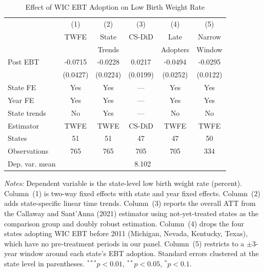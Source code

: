 \begin{table}[htbp]
\centering
\caption{Effect of WIC EBT Adoption on Low Birth Weight Rate}
\label{tab:main}
\begin{tabular}{lccccc}
\hline\hline
 & (1) & (2) & (3) & (4) & (5) \\
 & TWFE & State & CS-DiD & Late & Narrow \\
 & & Trends & & Adopters & Window \\
\hline
Post EBT & -0.0715 & -0.0228 & 0.0217 & -0.0494 & -0.0295 \\
 & (0.0427) & (0.0224) & (0.0199) & (0.0252) & (0.0122) \\
\hline
State FE & Yes & Yes & --- & Yes & Yes \\
Year FE & Yes & Yes & --- & Yes & Yes \\
State trends & No & Yes & --- & No & No \\
Estimator & TWFE & TWFE & CS-DiD & TWFE & TWFE \\
States & 51 & 51 & 47 & 47 & 50 \\
Observations & 765 & 765 & 705 & 705 & 334 \\
Dep. var. mean & \multicolumn{5}{c}{8.102} \\
\hline\hline
\end{tabular}
\begin{tablenotes}[flushleft]
\small
\item \textit{Notes:} Dependent variable is the state-level low birth weight rate (percent). Column~(1) is two-way fixed effects with state and year fixed effects. Column~(2) adds state-specific linear time trends. Column~(3) reports the overall ATT from the Callaway and Sant'Anna (2021) estimator using not-yet-treated states as the comparison group and doubly robust estimation. Column~(4) drops the four states adopting WIC EBT before 2011 (Michigan, Nevada, Kentucky, Texas), which have no pre-treatment periods in our panel. Column~(5) restricts to a $\pm$3-year window around each state's EBT adoption. Standard errors clustered at the state level in parentheses. $^{***}p<0.01$, $^{**}p<0.05$, $^{*}p<0.1$.
\end{tablenotes}
\end{table}
